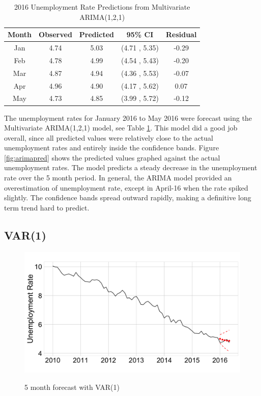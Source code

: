 \documentclass[twoside,twocolumn]{article}
\begin{document}
\begin{table}[ht]
\centering
\caption{2016 Unemployment Rate Predictions from Multivariate ARIMA(1,2,1)}
\label{tab:arimaforecast}
\begin{tabular}{ccccc}
  \hline
 Month & Observed & Predicted& 95\% CI  & Residual \\
  \hline
Jan & 4.74 & 5.03 & (4.71 , 5.35) & -0.29 \\
Feb & 4.78 & 4.99 & (4.54 , 5.43) & -0.20 \\
Mar & 4.87 & 4.94 & (4.36 , 5.53) & -0.07 \\
Apr & 4.96 & 4.90 & (4.17 , 5.62) & 0.07 \\
May & 4.73 & 4.85 & (3.99 , 5.72) & -0.12 \\
   \hline
\end{tabular}
\end{table}

The unemployment rates for January 2016 to May 2016 were forecast using the Multivariate ARIMA(1,2,1) model, see Table \ref{tab:arimaforecast}.  This model did a good job overall, since all predicted values were relatively close to the actual unemployment rates and entirely inside the confidence bands.  Figure \ref{fig:arimapred} shows the predicted values graphed against the actual unemployment rates. The model predicts a steady decrease in the unemployment rate over the 5 month period.  In general, the ARIMA model provided an overestimation of unemployment rate, except in April-16 when the rate spiked slightly. The confidence bands spread outward rapidly, making a definitive long term trend hard to predict.

\subsection{VAR(1)}

   \begin{figure}[htb]
    	\centering
     	\caption{5 month forecast with VAR(1)}
     	\includegraphics[width=\linewidth]{images/varpred}
     	\label{fig:varpred}
 \end{figure}
\end{document}
